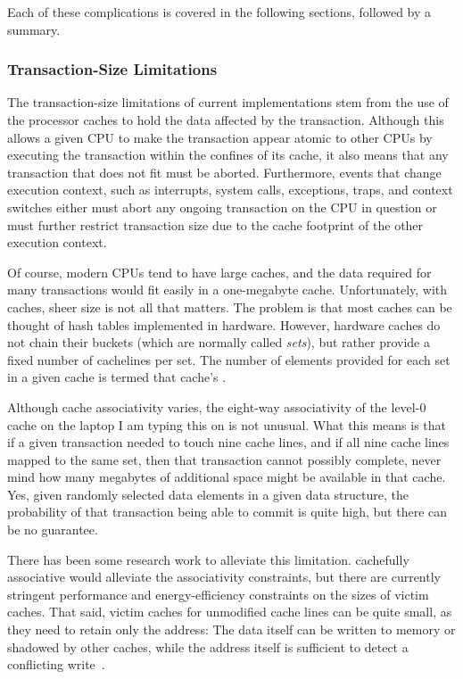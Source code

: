 Each of these complications is covered in the following sections,
followed by a summary.

\subsubsection{Transaction-Size Limitations}
\label{sec:future:Transaction-Size Limitations}

The transaction-size limitations of current  implementations
stem from the use of the processor caches to hold the data
affected by the transaction.
Although this allows a given CPU to make the transaction appear atomic to
other CPUs by executing the transaction within the confines of its cache,
it also means that any transaction that does not fit must be aborted.
Furthermore, events that change execution context, such as interrupts,
system calls, exceptions, traps, and context switches either must
abort any ongoing transaction on the CPU in question or must further
restrict transaction size due to the cache footprint of the other
execution context.

Of course, modern CPUs tend to have large caches, and the data required
for many transactions would fit easily in a one-megabyte cache.
Unfortunately, with caches, sheer size is not all that matters.
The problem is that most caches
can be thought of hash tables implemented in hardware.
However, hardware caches do not chain their buckets (which are normally
called \emph{sets}), but rather
provide a fixed number of cachelines per set.
The number of elements provided for each set in a given cache
is termed that cache's \emph{}.

Although cache associativity varies, the eight-way associativity of
the level-0 cache on the laptop I am typing this on is not unusual.
What this means is that if a given transaction needed to touch
nine cache lines, and if all nine cache lines mapped to the same
set, then that transaction cannot possibly complete, never mind how
many megabytes of additional space might be available in that cache.
Yes, given randomly selected data elements in a given data structure,
the probability of that transaction being able to commit is quite
high, but there can be no guarantee.

There has been some research work to alleviate this limitation.
{cache}{fully associative} would alleviate the associativity
constraints, but there are currently stringent performance and
energy-efficiency constraints on the sizes of victim caches.
That said,  victim caches for unmodified cache lines can be quite
small, as they need to retain only the address:
The data itself can be written to memory or shadowed by other caches,
while the address itself is sufficient to detect a conflicting
write~\cite{RaviRajwar2012TSX}.

